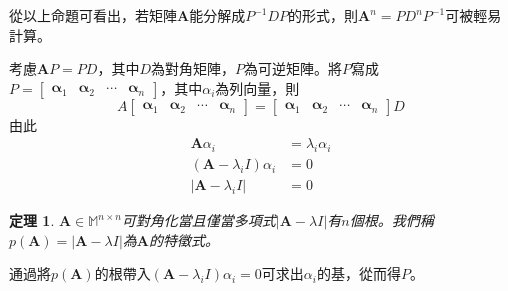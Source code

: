 \documentclass[12pt]{article}
\newtheorem*{theorem}{定理}
\begin{document}
    從以上命題可看出，若矩陣$\mathbf{A}$能分解成$P^{-1}DP$的形式，則$\mathbf{A}^n=PD^nP^{-1}$可被輕易計算。

    考慮$\mathbf{A}P=PD$，其中$D$為對角矩陣，$P$為可逆矩陣。將$P$寫成$P=\begin{bmatrix}
        \mathbf{\alpha}_1&\mathbf{\alpha}_2&\cdots&\mathbf{\alpha}_n
    \end{bmatrix}$，其中$\alpha_i$為列向量，則$$A\begin{bmatrix}
        \mathbf{\alpha}_1&\mathbf{\alpha}_2&\cdots&\mathbf{\alpha}_n
    \end{bmatrix}=\begin{bmatrix}
        \mathbf{\alpha}_1&\mathbf{\alpha}_2&\cdots&\mathbf{\alpha}_n
    \end{bmatrix}D$$
    由此\begin{align*}
        \mathbf{A}\alpha_i&=\lambda_i\alpha_i\\
        (\mathbf{A}-\lambda_iI)\alpha_i&=0\\
        |\mathbf{A}-\lambda_iI|&=0
    \end{align*}

    \begin{theorem}
        $\mathbf{A}\in\mathbb{M}^{n\times n}$可對角化當且僅當多項式$|\mathbf{A}-\lambda I|$有$n$個根。我們稱$p(\mathbf{A})=|\mathbf{A}-\lambda I|$為$\mathbf{A}$的特徵式。
    \end{theorem}

    通過將$p(\mathbf{A})$的根帶入$(\mathbf{A}-\lambda_iI)\alpha_i=0$可求出$\alpha_i$的基，從而得$P$。
\end{document}
